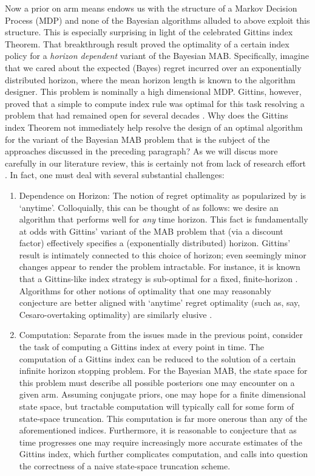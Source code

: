 Now a prior on arm means endows us with the structure of a Markov Decision Process (MDP) and none of the Bayesian algorithms alluded to above exploit this structure. This is especially surprising in light of the celebrated Gittins index Theorem. That breakthrough result proved the optimality of a certain index policy for a {\em horizon dependent} variant of the Bayesian MAB. Specifically, imagine that we cared about the expected (Bayes) regret incurred over an exponentially distributed horizon, where the mean horizon length is known to the algorithm designer. This problem is nominally a high dimensional MDP. Gittins, however, proved that a simple to compute index rule was optimal for this task resolving a problem that had remained open for several decades \citep{gittins1979bandit}. Why does the Gittins index Theorem not immediately help resolve the design of an optimal algorithm for the variant of the Bayesian MAB problem that is the subject of the approaches discussed in the preceding paragraph? As we will discus more carefully in our literature review, this is certainly not from lack of research effort \citep{lattimore2016bayesregret}. In fact, one must deal with several substantial challenges:
\begin{enumerate}
\item
Dependence on Horizon: The notion of regret optimality as popularized by \cite{lai1985asymptotically} is `anytime'. Colloquially, this can be thought of as follows: we desire an algorithm that performs well for {\em any} time horizon. This fact is fundamentally at odds with Gittins' variant of the MAB problem that (via a discount factor) effectively specifies a (exponentially distributed) horizon. Gittins' result is intimately connected to this choice of horizon; even seemingly minor changes appear to render the problem intractable. For instance, it is known that a Gittins-like index strategy is sub-optimal for a fixed, finite-horizon \citep{berry1985bandit}. Algorithms for other notions of optimality that one may reasonably conjecture are better aligned with `anytime' regret optimality (such as, say, Cesaro-overtaking optimality) are similarly elusive \citep{katehakis1996finite}.  
\item
Computation: Separate from the issues made in the previous point, consider the task of computing a Gittins index at every point in time. 
The computation of a Gittins index can be reduced to the solution of a certain infinite horizon stopping problem. For the Bayesian MAB, the state space for this problem must describe all possible posteriors one may encounter on a given arm. Assuming conjugate priors, one may hope for a finite dimensional state space, but tractable computation will typically call for some form of state-space truncation. This computation is far more onerous than any of the aforementioned indices. Furthermore, it is reasonable to conjecture that as time progresses one may require increasingly more accurate estimates of the Gittins index, which further complicates computation, and calls into question the correctness of a naive state-space truncation scheme. 
\end{enumerate}
